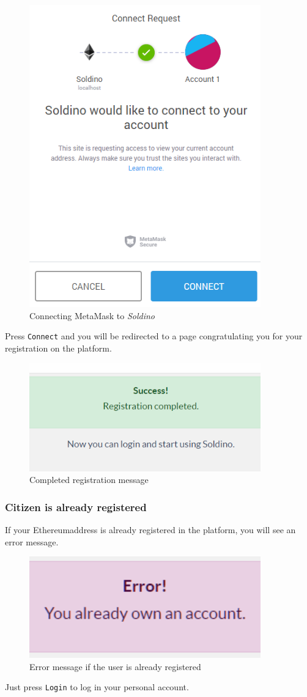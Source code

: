	\begin{figure}[H]
		\includegraphics[width=10cm]{res/images/metamask_connect.png}
		\centering
		\caption{Connecting MetaMask to \textit{Soldino}}
	\end{figure}
	\noindent Press \texttt{Connect} and you will be redirected to a page 
	congratulating you for your registration on the platform.
	\begin{figure}[H]
		\includegraphics[width=10cm]{res/images/registration_complete.png}
		\centering
		\caption{Completed registration message}
	\end{figure}
		\subsubsection{Citizen is already registered}
		If your Ethereum\glosp address is already registered in the platform, you will 
		see an error message.
		\begin{figure}[H]
			\includegraphics[width=10cm]{res/images/user_already_registered.png}
			\centering
			\caption{Error message if the user is already registered}
		\end{figure}
		\noindent Just press \texttt{Login} to log in your personal account.
